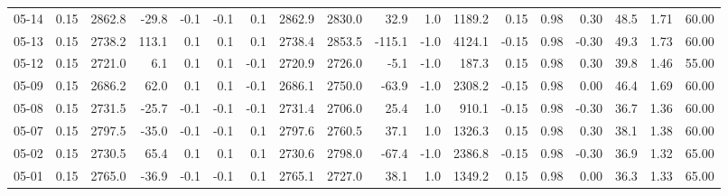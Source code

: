 \begin{threeparttable}
{\begin{tabular}{lrrrrrrrrrrrrrrrrr}
  05-14 &     0.15 & 2862.8 &             -29.8 &              -0.1 &               -0.1 &                0.1 & 2862.9 & 2830.0 &       32.9 &                      1.0 &              1189.2 &       0.15 &      0.98 &           0.30 &             48.5 &            1.71 &                  60.00 \\
  05-13 &     0.15 & 2738.2 &             113.1 &               0.1 &                0.1 &                0.1 & 2738.4 & 2853.5 &     -115.1 &                     -1.0 &              4124.1 &      -0.15 &      0.98 &          -0.30 &             49.3 &            1.73 &                  60.00 \\
  05-12 &     0.15 & 2721.0 &               6.1 &               0.1 &                0.1 &               -0.1 & 2720.9 & 2726.0 &       -5.1 &                     -1.0 &               187.3 &       0.15 &      0.98 &           0.30 &             39.8 &            1.46 &                  55.00 \\
  05-09 &     0.15 & 2686.2 &              62.0 &               0.1 &                0.1 &               -0.1 & 2686.1 & 2750.0 &      -63.9 &                     -1.0 &              2308.2 &      -0.15 &      0.98 &           0.00 &             46.4 &            1.69 &                  60.00 \\
  05-08 &     0.15 & 2731.5 &             -25.7 &              -0.1 &               -0.1 &               -0.1 & 2731.4 & 2706.0 &       25.4 &                      1.0 &               910.1 &      -0.15 &      0.98 &          -0.30 &             36.7 &            1.36 &                  60.00 \\
  05-07 &     0.15 & 2797.5 &             -35.0 &              -0.1 &               -0.1 &                0.1 & 2797.6 & 2760.5 &       37.1 &                      1.0 &              1326.3 &       0.15 &      0.98 &           0.30 &             38.1 &            1.38 &                  60.00 \\
  05-02 &     0.15 & 2730.5 &              65.4 &               0.1 &                0.1 &                0.1 & 2730.6 & 2798.0 &      -67.4 &                     -1.0 &              2386.8 &      -0.15 &      0.98 &          -0.30 &             36.9 &            1.32 &                  65.00 \\
  05-01 &     0.15 & 2765.0 &             -36.9 &              -0.1 &               -0.1 &                0.1 & 2765.1 & 2727.0 &       38.1 &                      1.0 &              1349.2 &       0.15 &      0.98 &           0.00 &             36.3 &            1.33 &                  65.00 \\

\end{tabular}}
\end{threeparttable}

